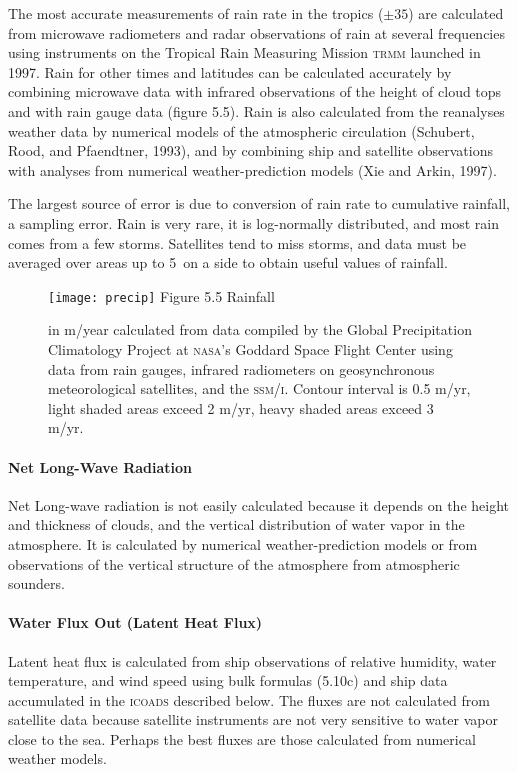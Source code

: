 The most accurate measurements of rain rate in the tropics
($\pm 35$\degrees) are calculated from microwave radiometers and radar
observations of rain at several frequencies using instruments on the
Tropical Rain Measuring Mission \textsc{trmm} launched in 1997. Rain
for other times and latitudes can be calculated accurately by
combining microwave data with infrared observations of the height of
cloud tops and with rain gauge data (figure 5.5). Rain is also
calculated from the reanalyses weather data by numerical models of the
atmospheric circulation (Schubert, Rood, and Pfaendtner, 1993), and by
combining ship and satellite observations with analyses from numerical
weather-prediction models (Xie and Arkin, 1997).

The largest source of error is due to conversion of rain rate to
cumulative rainfall, a sampling
error. Rain is very rare, it is log-normally
distributed, and most rain comes from a few storms. Satellites tend to
miss storms, and data must be averaged over areas up to 5\degrees\ on
a side to obtain useful values of rainfall.

\begin{figure}[t!]
\texttt{[image: precip]} 
\footnotesize Figure 5.5 Rainfall
\rule{0pt}{3ex}in m/year calculated from data compiled by the Global Precipitation Climatology
Project at \textsc{nasa}'s Goddard Space Flight Center using data from
rain gauges, infrared radiometers on geosynchronous meteorological
satellites, and the \textsc{ssm/i}.  Contour interval is 0.5 m/yr,
light shaded areas exceed 2 m/yr, heavy shaded areas exceed 3
m/yr. \label{fig:precip}
\vspace{-4ex}
\end{figure}

\paragraph{Net Long-Wave Radiation}
Net
Long-wave radiation is not easily calculated because it depends on the
height and thickness of clouds, and the vertical distribution of water
vapor in the atmosphere. It is calculated by numerical
weather-prediction models or from observations of the vertical
structure of the atmosphere from atmospheric sounders.

\paragraph{Water Flux Out (Latent Heat Flux)}
 Latent heat flux is calculated from ship
observations of relative humidity, water temperature, and wind speed
using bulk formulas (5.10c) and ship data accumulated in the
\textsc{icoads} described below. The fluxes are not
calculated from satellite data because satellite instruments are not
very sensitive to water vapor close to the sea. Perhaps the best
fluxes are those calculated from numerical weather models.

